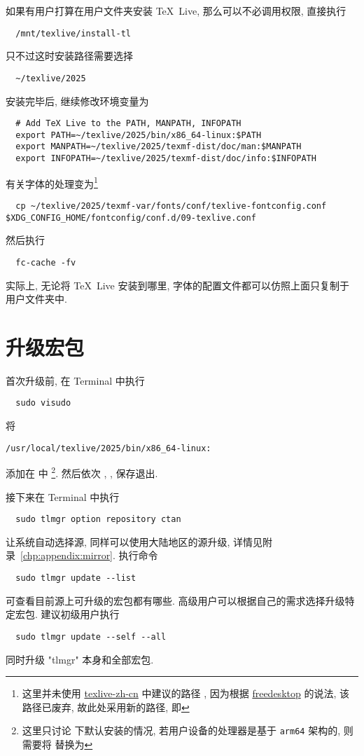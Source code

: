 如果有用户打算在用户文件夹安装 \TeX~Live,
那么可以不必调用权限,
直接执行
\begin{lstlisting}
  /mnt/texlive/install-tl
\end{lstlisting}
只不过这时安装路径需要选择
\begin{lstlisting}
  ~/texlive/2025
\end{lstlisting}
安装完毕后,
继续修改环境变量为
\begin{lstlisting}
  # Add TeX Live to the PATH, MANPATH, INFOPATH
  export PATH=~/texlive/2025/bin/x86_64-linux:$PATH
  export MANPATH=~/texlive/2025/texmf-dist/doc/man:$MANPATH
  export INFOPATH=~/texlive/2025/texmf-dist/doc/info:$INFOPATH
\end{lstlisting}
有关字体的处理变为\footnote{这里并未使用 \href{https://tug.org/texlive/doc/texlive-zh-cn/texlive-zh-cn.pdf}{\textsf{texlive-zh-cn}} 中建议的路径 ,
因为根据 \href{https://www.freedesktop.org/software/fontconfig/fontconfig-user.html}{freedesktop} 的说法,
该路径已废弃,
故此处采用新的路径,
即 }
\begin{lstlisting}
  cp ~/texlive/2025/texmf-var/fonts/conf/texlive-fontconfig.conf $XDG_CONFIG_HOME/fontconfig/conf.d/09-texlive.conf
\end{lstlisting}
然后执行
\begin{lstlisting}
  fc-cache -fv
\end{lstlisting}
实际上,
无论将 \TeX~Live 安装到哪里,
字体的配置文件都可以仿照上面只复制于用户文件夹中.

\section{升级宏包}\label{sec:ubuntu:update}

首次升级前,
在 \textsf{Terminal} 中执行
\begin{lstlisting}
  sudo visudo
\end{lstlisting}
将
\begin{lstlisting}[language = {}]
  /usr/local/texlive/2025/bin/x86_64-linux:
\end{lstlisting}
添加在  中%
\footnote{这里只讨论  下默认安装的情况,
若用户设备的处理器是基于 \texttt{arm64} 架构的,
则需要将  替换为 }.
然后依次 , , \keys{\enter} 保存退出.

接下来在 \textsf{Terminal} 中执行
\begin{lstlisting}
  sudo tlmgr option repository ctan
\end{lstlisting}
让系统自动选择源,
同样可以使用大陆地区的源升级,
详情见附录~\ref{chp:appendix:mirror}.
执行命令
\begin{lstlisting}
  sudo tlmgr update --list
\end{lstlisting}
可查看目前源上可升级的宏包都有哪些. 
高级用户可以根据自己的需求选择升级特定宏包.
建议初级用户执行
\begin{lstlisting}
  sudo tlmgr update --self --all
\end{lstlisting}
同时升级 "tlmgr" 本身和全部宏包. 

